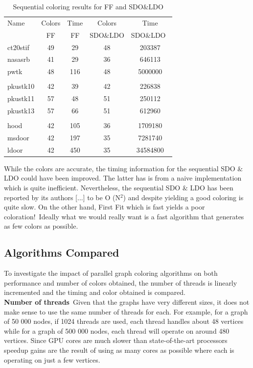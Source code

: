 \documentclass[preprint]{sigplanconf}
\begin{document}
\begin{table}
\scriptsize
\begin{center}
\begin{tabular}{l c c c c}
\hline
Name & Colors  & Time  & Colors & Time \\
 & FF & FF &   SDO$\&$LDO &  SDO$\&$LDO\
\\
\hline
ct20stif & 49 & 29 & 48 & 203387 \\
nasasrb & 41 & 29 & 36 & 646113 \\
pwtk  & 48 & 116 & 48 & 5000000 \\
\\
pkustk10 & 42 & 39 & 42 & 226838 \\
pkustk11 & 57 & 48 & 51 & 250112 \\
pkustk13 & 57 & 66 & 51 & 612960\\
\\
hood & 42 & 105 & 36  & 1709180 \\
msdoor & 42 & 197 & 35 & 7281740 \\
ldoor & 42 & 450 & 35 & 34584800 \\

\end{tabular}
\caption{Sequential coloring results for FF and SDO$\&$LDO}
\label{amean_time}
\end{center}
\end{table}


While the colors are accurate, the timing information for the sequential SDO $\&$ LDO could have been improved. The latter has is from a naive implementation which is quite inefficient. Nevertheless, the sequential SDO $\&$ LDO has been reported by its authors [...] to be O (N$^2$) and despite yielding a good coloring is quite slow. On the other hand, First Fit which is fast yields a poor coloration!\
Ideally what we would really want is a fast algorithm that generates as few colors as possible.

           
\subsection{Algorithms Compared}

To investigate the impact of parallel graph coloring algorithms on  both performance and number of colors obtained, the number of threads is linearly incremented and the timing and color obtained is compared.\\

\textbf{Number of threads}\
Given that the graphs have very different sizes, it does not make sense to use the same number of threads for each. For example, for a graph of 50 000 nodes, if 1024 threads are used, each thread handles about 48 vertices while for a graph of 500 000 nodes, each thread will operate on around 480 vertices. Since GPU cores are much slower than state-of-the-art processors speedup gains are the result of using as many cores as possible where each is operating on just a few vertices.
\end{document}
